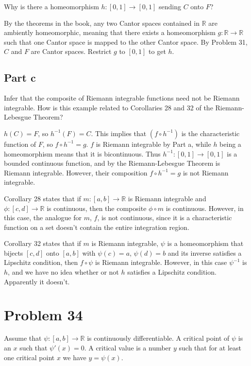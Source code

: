 \documentclass{article}
\newcommand{\R}{\mathbb{R}}
\begin{document}
Why is there a homeomorphism $h: [0, 1] \rightarrow [0, 1]$ sending $C$ onto $F$?

By the theorems in the book, any two Cantor spaces contained in $\R$ are ambiently homeomorphic, meaning that there exists a homeomorphism $g: \R \rightarrow \R$ such that one Cantor space is mapped to the other Cantor space. By Problem 31, $C$ and $F$ are Cantor spaces. Restrict $g$ to $[0, 1]$ to get $h$.

\subsection*{Part c}

Infer that the composite of Riemann integrable functions need not be Riemann integrable. How is this example related to Corollaries 28 and 32 of the Riemann-Lebesgue Theorem?

$h(C) = F$, so $h^{-1}(F) = C$. This implies that $(f \circ h^{-1})$ is the characteristic function of $F$, so $f \circ h^{-1} = g$. $f$ is Riemann integrable by Part a, while $h$ being a homeomorphism means that it is bicontinuous. Thus $h^{-1}: [0, 1] \rightarrow [0, 1]$ is a bounded continuous function, and by the Riemann-Lebesgue Theorem is Riemann integrable. However, their composition $f \circ h^{-1} = g$ is not Riemann integrable.

Corollary 28 states that if $m: [a, b] \rightarrow \R$ is Riemann integrable and $\phi: [c, d] \rightarrow \R$ is continuous, then the composite $\phi \circ m$ is continuous. However, in this case, the analogue for $m$, $f$, is not continuous, since it is a characteristic function on a set doesn't contain the entire integration region.

Corollary 32 states that if $m$ is Riemann integrable, $\psi$ is a homeomorphism that bijects $[c, d]$ onto $[a, b]$ with $\psi(c) = a$, $\psi(d) = b$ and its inverse satisfies a Lipschitz condition, then $f \circ \psi$ is Riemann integrable. However, in this case $\psi^{-1}$ is $h$, and we have no idea whether or not $h$ satisfies a Lipschitz condition. Apparently it doesn't.

\section*{Problem 34}

Assume that $\psi: [a, b] \rightarrow \R$ is continuously differentiable. A critical point of $\psi$ is an $x$ such that $\psi'(x) = 0$. A critical value is a number $y$ such that for at least one critical point $x$ we have $y = \psi(x)$.
\end{document}
